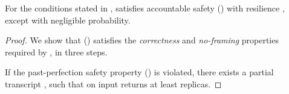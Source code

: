 

\begin{lemma}\label{lem:pod-accountable-safety}
	For the conditions stated in ,  satisfies accountable safety () with resilience \beta, except with negligible probability.
\end{lemma}
\begin{proof}
	We show that \identify{} () satisfies the \emph{correctness} and \emph{no-framing} properties required by , in three steps.

	If the past-perfection safety property () is violated, there exists a partial transcript \tran, such that \identify{} on input \tran returns at least \beta replicas.


\end{proof}
